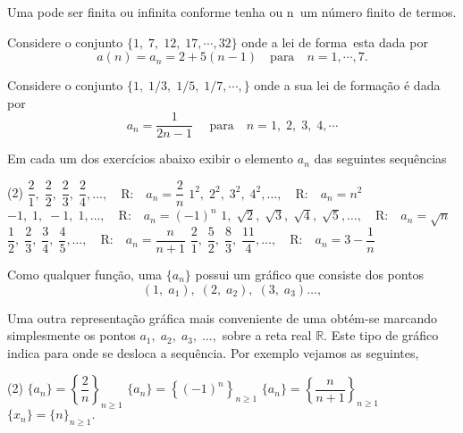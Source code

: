 Uma \seq pode ser finita ou infinita conforme tenha ou n\ao\ um
n\'{u}mero finito de termos.

\begin{exem}
Considere o conjunto
$\{1,\; 7,\; 12,\; 17,\cdots,32\}$ onde a lei de forma\cao\ esta dada por
\begin{equation*}
a(n)=a_n=2+5(n-1) \quad \text{para} \quad n=1,\cdots,7.
\end{equation*}
\end{exem}

\begin{exem}
Considere o conjunto
$\{1,\; 1/3,\; 1/5,\; 1/7,\cdots,\}$ onde a sua lei de formação é dada
por 
\begin{equation*}
  a_n=\dfrac{1}{2n-1} \quad \text{ para} \quad  n=1,\; 2,\; 3,\; 4,\cdots
\end{equation*}
\end{exem}

\begin{exer}
Em cada um dos exercícios abaixo exibir o elemento $a_n$ das seguintes sequ\^{e}ncias
\begin{tasks}[label=(\alph*),item-indent=3em,label-width=3ex,ref=(\alph*)](2)
\task \(\dfrac{2}{1},\; \dfrac{2}{2},\; \dfrac{2}{3},\; \dfrac{2}{4},\ldots, \quad \text{R:} \quad a_n=\dfrac{2}{n}\)
\task \(1^2,\; 2^2,\; 3^2,\; 4^2,\ldots, \quad \text{R:}\quad  a_n=n^{2}\)
\task \(-1,\; 1,\; -1,\; 1,\ldots,\quad  \text{R:}\quad a_n=(-1)^{n}\)
\task \(1,\; \sqrt{2},\; \sqrt{3},\; \sqrt{4},\; \sqrt{5},\ldots,\quad \text{R:}\quad a_n=\sqrt{n}\)
\task \(\dfrac{1}{2},\; \dfrac{2}{3},\; \dfrac{3}{4},\; \dfrac{4}{5},\ldots, \quad \text{R:}\quad  a_n=\dfrac{n}{n+1}\)
\task \(\dfrac{2}{1},\;\dfrac{5}{2},\; \dfrac{8}{3},\; \dfrac{11}{4},\ldots,\quad \text{R:}\quad  a_n=3-\dfrac{1}{n}\)
\end{tasks}
\end{exer}

Como qualquer fun\c{c}\~{a}o, uma \seq $\{a_n\}$ possui um gr\'{a}fico que consiste dos pontos
\begin{equation*}
    (1,\; a_1),\; (2,\; a_2),\; (3,\; a_3)\ldots,
\end{equation*}

Uma outra representa\c{c}\~{a}o gr\'{a}fica mais conveniente de uma \seq obt\'{e}m-se marcando simplesmente os pontos $a_1,\;a_2,\; a_3,\; \dots,$ sobre
a reta real $\mathbb{R}$. Este tipo de gr\'{a}fico indica para onde se desloca a sequ\^{e}ncia. Por exemplo vejamos 
as seguintes,
\begin{tasks}[label=(\alph*),item-indent=3em,label-width=3ex,ref=(\alph*)](2)
\task \(\{a_n\}=\left\{\dfrac{2}{n} \right\}_{n\geq 1}\)
\task \(\{a_n\}=\left\{(-1)^{n} \right\}_{n\geq 1}\)
\task \(\{a_n\}=\left\{\dfrac{n}{n+1}\right\}_{n\geq 1}\) 
\task \(\{x_n\}=\{n\}_{n\geq 1}.\)
\end{tasks}

